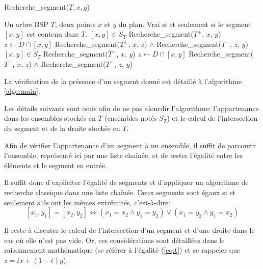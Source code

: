 
\begin{algorithm}
  \caption{Recherche\_segment($T, x, y$)}
  \begin{algorithmic}[1] \label{algo:main}
    \REQUIRE Un arbre BSP $T$, deux points $x$ et $y$ du plan.
    \ENSURE Vrai si et seulement si le segment $[x, y]$ est contenu dans $T$.
    \RETURN $[x, y]\in S_T$
    \ENDIF
      \RETURN Recherche\_segment($T^+$, $x$, $y$)
      \ELSE
      \STATE $z \leftarrow D \cap [x, y]$
      \RETURN Recherche\_segment($T^+$, $x$, $z$) $\land$
              Recherche\_segment($T^-$, $z$, $y$)
      \ENDIF
      \ELSE
      \RETURN $[x, y]\in S_T$
      \RETURN Recherche\_segment($T^-$, $x$, $y$)
      \ELSE
      \STATE $z \leftarrow D \cap [x, y]$
      \RETURN Recherche\_segment($T^-$, $x$, $z$) $\land$
              Recherche\_segment($T^+$, $z$, $y$)
      \ENDIF
    \ENDIF
  \end{algorithmic}
\end{algorithm}

La vérification de la présence d'un segment donné est détaillé à
l'algorithme \ref{algo:main}.

Les détails suivants sont omis afin de ne pas alourdir l'algorithme:
l'appartenance dans les ensembles stockés en $T$ (ensembles notés
$S_T$) et le calcul de l'intersection du segment et de la
droite stockée en $T$.

Afin de vérifier l'appartenance d'un segment à un ensemble, il
suffit de parcourir l'ensemble, représenté ici par une liste
chaînée, et de tester l'égalité entre les éléments et le segment
en entrée.

Il suffit donc d'expliciter l'égalité de segments et d'appliquer
un algorithme de recherche classique dans une liste chaînée.
Deux segments sont égaux si et seulement s'ils ont les
mêmes extrémités, c'est-à-dire:
$$ [x_1, y_1] = [x_2, y_2] \iff
(x_1 = x_2 \land y_1 = y_2) \lor (x_1 = y_2 \land y_1 = x_2) $$

Il reste à discuter le calcul de l'intersection d'un segment
et d'une droite dans le cas où elle n'est pas vide. Or, ces
considérations sont détaillées dans le raisonnement mathématique
(se référer à l'égalité (\ref{eq:t}) et se rappeler que $z = tx + (1-t) y$).
